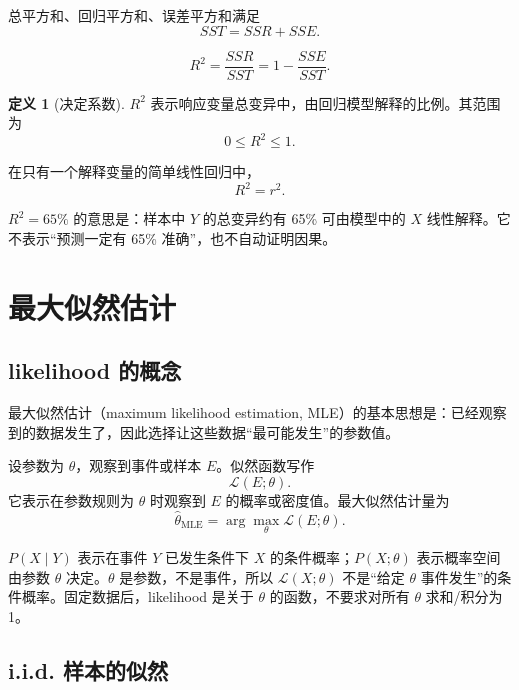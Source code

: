 \documentclass[11pt,a4paper]{article}
\theoremstyle{definition}
\newtheorem{definition}{定义}[section]
\theoremstyle{plain}
\theoremstyle{remark}
\begin{document}
总平方和、回归平方和、误差平方和满足
\[
    SST=SSR+SSE.
\]
\begin{memorybox}
\[
    \boxed{
    R^2=\frac{SSR}{SST}=1-\frac{SSE}{SST}.
    }
\]
\end{memorybox}

\begin{definition}[决定系数]
$R^2$ 表示响应变量总变异中，由回归模型解释的比例。其范围为
\[
    0\le R^2\le 1.
\]
\end{definition}

在只有一个解释变量的简单线性回归中，
\[
    \boxed{R^2=r^2.}
\]

\begin{warnbox}[解释 $R^2$]
$R^2=65\%$ 的意思是：样本中 $Y$ 的总变异约有 65\% 可由模型中的 $X$ 线性解释。它不表示“预测一定有 65\% 准确”，也不自动证明因果。
\end{warnbox}

\section{最大似然估计}
\label{sec:mle}

\subsection{likelihood 的概念}

最大似然估计（maximum likelihood estimation, MLE）的基本思想是：已经观察到的数据发生了，因此选择让这些数据“最可能发生”的参数值。

设参数为 $\theta$，观察到事件或样本 $E$。似然函数写作
\[
    \mathcal L(E;\theta).
\]
它表示在参数规则为 $\theta$ 时观察到 $E$ 的概率或密度值。最大似然估计量为
\[
    \hat\theta_{\mathrm{MLE}}
    =
    \arg\max_\theta \mathcal L(E;\theta).
\]

\begin{warnbox}
$P(X\mid Y)$ 表示在事件 $Y$ 已发生条件下 $X$ 的条件概率；$P(X;\theta)$ 表示概率空间由参数 $\theta$ 决定。$\theta$ 是参数，不是事件，所以 $\mathcal L(X;\theta)$ 不是“给定 $\theta$ 事件发生”的条件概率。固定数据后，likelihood 是关于 $\theta$ 的函数，不要求对所有 $\theta$ 求和/积分为 1。
\end{warnbox}

\subsection{i.i.d. 样本的似然}
\end{document}

